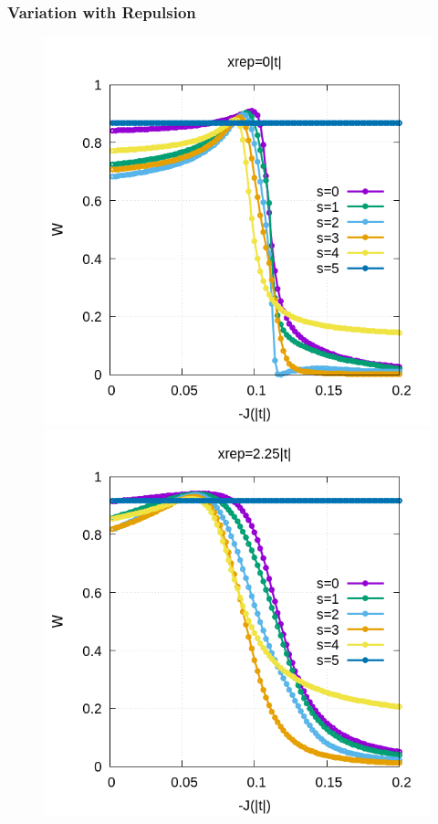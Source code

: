 \documentclass[12pt,twoside]{report}
\begin{document}
	
	
	\subsubsection{Variation with Repulsion}
	\begin{figure}[h!]
		\centering
		\hspace{-2cm}
		\begin{minipage}{0.4\textwidth}
			\includegraphics[scale=0.4]{W_vs_J_sites_2-xrep-01.png}
		\end{minipage}
		\hspace{2cm}
		\begin{minipage}{0.4\textwidth}
			\includegraphics[scale=0.4]{W_vs_J_sites_2-xrep-225.png}

\end{minipage}
\end{figure}
\end{document}
